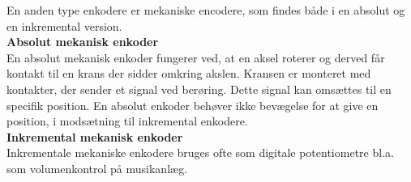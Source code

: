 En anden type enkodere er mekaniske encodere, som findes både i en absolut og en inkremental version. \\

{\bf Absolut mekanisk enkoder}\\
En absolut mekanisk enkoder fungerer ved, at en aksel roterer og derved får kontakt til en krans der sidder omkring akslen. Kransen er monteret med kontakter, der sender et signal ved berøring. Dette signal kan omsættes til en specifik position. En absolut enkoder behøver ikke bevægelse for at give en position, i modsætning til inkremental enkodere.\\[5mm}]

 {\bf Inkremental mekanisk enkoder}\\
Inkrementale mekaniske enkodere bruges ofte som digitale potentiometre bl.a. som volumenkontrol på musikanlæg.